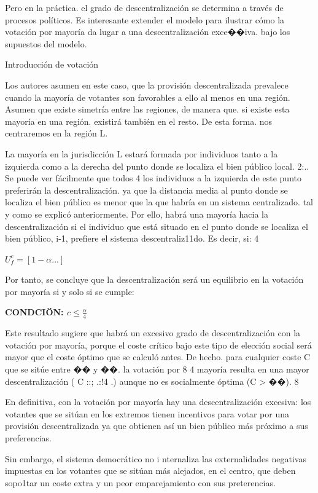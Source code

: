 \documentclass[10pt,a4paper]{article}
\begin{document}
Pero en la práctica. el grado de descentralización se determina a través de procesos políticos. Es interesante extender el modelo para ilustrar cómo la votación por mayoría da lugar a una descentralización exce��iva. bajo los supuestos del modelo.

Introducción de votación

Los autores asumen en este caso, que la provisión descentralizada prevalece cuando la mayoría de votantes son favorables a ello al menos en una región. Asumen que existe simetría entre las regiones, de manera que. si existe esta mayoría en una región. existirá también en el resto. De esta forma. nos centraremos en la región L.

La mayoría en la jurisdicción L estará formada por individuos tanto a la izquierda como a la
derecha del punto donde se localiza el bien público local. 2:.. Se puede ver fácilmente que todos
4
los individuos a la izquierda de este punto preferirán la descentralización. ya que la distancia
media al punto donde se localiza el bien público es menor que la que habría en un sistema
centralizado. tal y como se explicó anteriormente.
Por ello, habrá una mayoría hacia la descentralización si el individuo que está situado en el punto donde se localiza el bien público, i-1, prefiere el sistema descentraliz11do. Es decir, si: 4

$U_f^c=[1-\alpha...]$

Por tanto, se concluye que la descentralización será un equilibrio en la votación por mayoría si y solo si se cumple:

\textbf{CONDCIÖN: $c\leq\frac{\alpha}{4}$}

Este resultado sugiere que habrá un excesivo grado de descentralización con la votación por mayoría, porque el coste crítico bajo este tipo de elección social será mayor que el coste óptimo que se calculó antes. De hecho. para cualquier coste C que se sitúe entre �� y ��. la votación por 8 4 mayoría resulta en una mayor descentralización ( C ::; .:!4 .) aunque no es socialmente óptima (C >
��). 8

En definitiva, con la votación por mayoría hay una descentralización excesiva: los votantes que se sitúan en los extremos tienen incentivos para votar por una provisión descentralizada ya que obtienen así un bien público más próximo a sus preferencias.

Sin embargo, el sistema democrático no i nternaliza las externalidades negativas impuestas en los votantes que se sitúan más alejados, en el centro, que deben sopo1tar un coste extra y un peor emparejamiento con sus preterencias.
\end{document}
